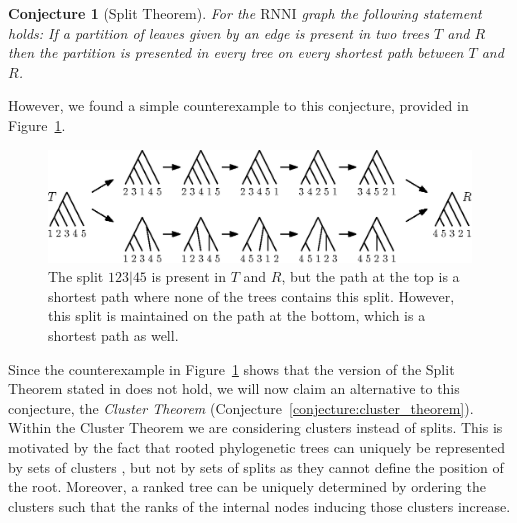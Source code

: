 \documentclass{amsart}
\newcommand{\rnni}{\mathrm{RNNI}}
\newtheorem{conjecture}[definition]{Conjecture}
\begin{document}
\begin{conjecture}[Split Theorem]
	For the $\rnni$ graph the following statement holds:
	If a partition of leaves given by an edge is present in two trees $T$ and $R$ then the partition is presented in every tree on every shortest path between $T$ and $R$.
	\label{conjecture:split_theorem}
\end{conjecture}

However, we found a simple counterexample to this conjecture, provided in Figure~\ref{fig:splitthm_counterexample}.

\begin{figure}[H]
	\centering
	\includegraphics[width=\textwidth]{splitthm_counterexample}
	\caption{The split $123|45$ is present in $T$ and $R$, but the path at the top is a shortest path where none of the trees contains this split.
    However, this split is maintained on the path at the bottom, which is a shortest path as well.}
	\label{fig:splitthm_counterexample}
\end{figure}

Since the counterexample in Figure~\ref{fig:splitthm_counterexample} shows that the version of the Split Theorem stated in \autocite{Gavryushkin2018-ol} does not hold, we will now claim an alternative to this conjecture, the \emph{Cluster Theorem} (Conjecture~\ref{conjecture:cluster_theorem}).
Within the Cluster Theorem we are considering clusters instead of splits.
This is motivated by the fact that rooted phylogenetic trees can uniquely be represented by sets of clusters \autocite{Steel2016-ye}, but not by sets of splits as they cannot define the position of the root.
Moreover, a ranked tree can be uniquely determined by ordering the clusters such that the ranks of the internal nodes inducing those clusters increase.

%
%
\end{document}
